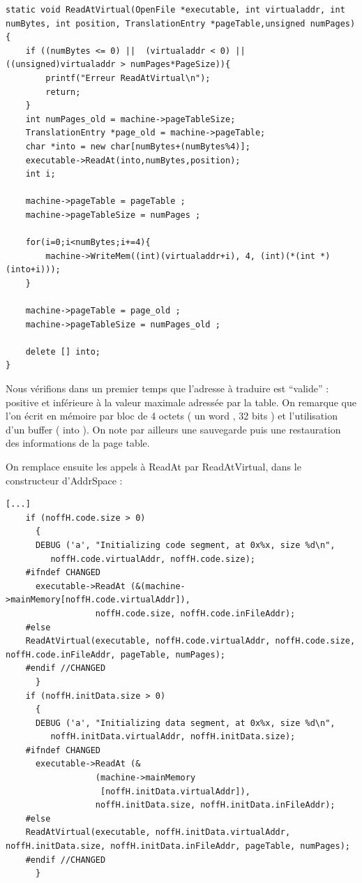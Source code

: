 \documentclass[a4paper,10pt]{article}
\begin{document}
\begin{lstlisting}[frame=single]
 static void ReadAtVirtual(OpenFile *executable, int virtualaddr, int numBytes, int position, TranslationEntry *pageTable,unsigned numPages){
	if ((numBytes <= 0) ||  (virtualaddr < 0) || ((unsigned)virtualaddr > numPages*PageSize)){
		printf("Erreur ReadAtVirtual\n");
		return;
	}
	int numPages_old = machine->pageTableSize;
	TranslationEntry *page_old = machine->pageTable;
	char *into = new char[numBytes+(numBytes%4)];
	executable->ReadAt(into,numBytes,position);
	int i;

	machine->pageTable = pageTable ;
	machine->pageTableSize = numPages ;
	
	for(i=0;i<numBytes;i+=4){
		machine->WriteMem((int)(virtualaddr+i), 4, (int)(*(int *)(into+i)));
	}

	machine->pageTable = page_old ;
	machine->pageTableSize = numPages_old ;

	delete [] into;
}
\end{lstlisting}

Nous vérifions dans un premier temps que l'adresse à traduire est ``valide'' : positive et inférieure à la valeur maximale adressée par la table.
On remarque que l'on écrit en mémoire par bloc de 4 octets ( un word , 32 bits ) et l'utilisation d'un buffer ( into ). On note par ailleurs une sauvegarde puis une restauration
des informations de la page table.

On remplace ensuite les appels à ReadAt par ReadAtVirtual, dans le constructeur d'AddrSpace :

\begin{lstlisting}[frame=single]
[...]
    if (noffH.code.size > 0)
      {
	  DEBUG ('a', "Initializing code segment, at 0x%x, size %d\n",
		 noffH.code.virtualAddr, noffH.code.size);
	#ifndef CHANGED
	  executable->ReadAt (&(machine->mainMemory[noffH.code.virtualAddr]),
			      noffH.code.size, noffH.code.inFileAddr);
	#else
	ReadAtVirtual(executable, noffH.code.virtualAddr, noffH.code.size, noffH.code.inFileAddr, pageTable, numPages);
	#endif //CHANGED
      }
    if (noffH.initData.size > 0)
      {
	  DEBUG ('a', "Initializing data segment, at 0x%x, size %d\n",
		 noffH.initData.virtualAddr, noffH.initData.size);
	#ifndef CHANGED
	  executable->ReadAt (&
			      (machine->mainMemory
			       [noffH.initData.virtualAddr]),
			      noffH.initData.size, noffH.initData.inFileAddr);
	#else
	ReadAtVirtual(executable, noffH.initData.virtualAddr, noffH.initData.size, noffH.initData.inFileAddr, pageTable, numPages);
	#endif //CHANGED
      }
\end{lstlisting}
\end{document}
